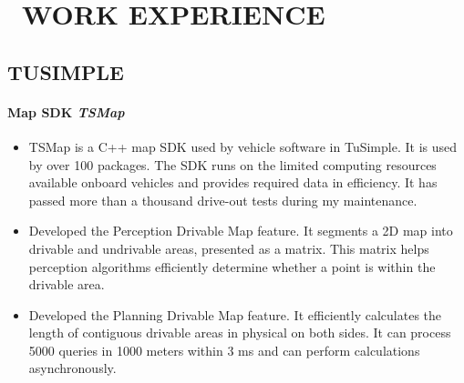 \section{\faUsers\ WORK EXPERIENCE}


\subsection{TUSIMPLE}
    \paragraph{Map SDK \textit{TSMap}}
        \begin{itemize}
            \item 
                TSMap is a C++ map SDK used by vehicle software in TuSimple.
                It is used by over 100 packages.
                The SDK runs on the limited computing resources available onboard vehicles
                and provides required data in efficiency.
                It has passed more than a thousand drive-out tests during my maintenance.
            \item 
                Developed the Perception Drivable Map feature.
                It segments a 2D map into drivable and undrivable areas, 
                presented as a matrix.
                This matrix helps perception algorithms efficiently determine whether a point is within the drivable area.
            \item 
                Developed the Planning Drivable Map feature.
                It efficiently calculates the length of contiguous drivable areas in physical on both sides.
                It can process 5000 queries in 1000 meters within 3 ms and can perform calculations asynchronously.
        \end{itemize}

